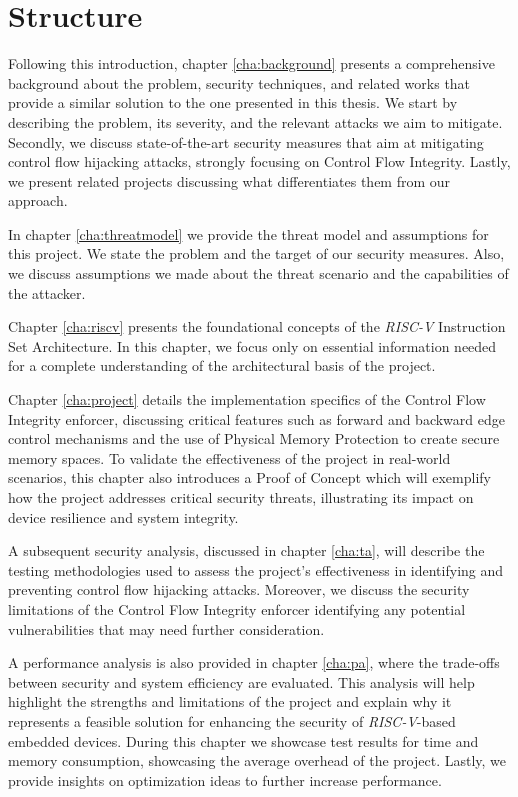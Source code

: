 \section{Structure}
\label{sec:intro_structure}

Following this introduction, chapter \ref{cha:background} presents a comprehensive
background about the problem, security techniques, and related works that provide
a similar solution to the one presented in this thesis. We start by describing
the problem, its severity, and the relevant attacks we aim to mitigate. Secondly,
we discuss state-of-the-art security measures that aim at mitigating control
flow hijacking attacks, strongly focusing on Control Flow Integrity. Lastly, we present
related projects discussing what differentiates them from our approach.

In chapter \ref{cha:threatmodel} we provide the threat model and assumptions for
this project. We state the problem and the target of our security measures. Also,
we discuss assumptions we made about the threat scenario and the capabilities of
the attacker.

Chapter \ref{cha:riscv} presents the foundational concepts of the \textit{RISC-V}
Instruction Set Architecture. In this chapter, we focus only on essential information
needed for a complete understanding of the architectural basis of the project.

Chapter \ref{cha:project} details the implementation specifics of the Control Flow
Integrity enforcer, discussing critical features such as forward and backward
edge control mechanisms and the use of Physical Memory Protection to create
secure memory spaces. To validate the effectiveness of the project in real-world
scenarios, this chapter also introduces a Proof of Concept which will exemplify
how the project addresses critical security threats, illustrating its impact on device
resilience and system integrity.

A subsequent security analysis, discussed in chapter \ref{cha:ta}, will describe
the testing methodologies used to assess the project's effectiveness in identifying
and preventing control flow hijacking attacks. Moreover, we discuss the security
limitations of the Control Flow Integrity enforcer identifying any potential vulnerabilities
that may need further consideration.

A performance analysis is also provided in chapter \ref{cha:pa}, where the trade-offs
between security and system efficiency are evaluated. This analysis will help highlight
the strengths and limitations of the project and explain why it represents a feasible
solution for enhancing the security of \textit{RISC-V}-based embedded devices. During
this chapter we showcase test results for time and memory consumption,
showcasing the average overhead of the project. Lastly, we provide insights on
optimization ideas to further increase performance.

